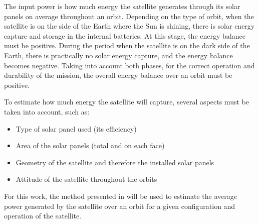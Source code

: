 



The input power is how much energy the satellite generates through its solar panels on average throughout an orbit. Depending on the type of orbit, when the satellite is on the side of the Earth where the Sun is shining, there is solar energy capture and storage in the internal batteries. At this stage, the energy balance must be positive. During the period when the satellite is on the dark side of the Earth, there is practically no solar energy capture, and the energy balance becomes negative. Taking into account both phases, for the correct operation and durability of the mission, the overall energy balance over an orbit must be positive.

To estimate how much energy the satellite will capture, several aspects must be taken into account, such as:

\begin{itemize}
    \item Type of solar panel used (its efficiency)
    \item Area of the solar panels (total and on each face)
    \item Geometry of the satellite and therefore the installed solar panels
    \item Attitude of the satellite throughout the orbits
\end{itemize}

For this work, the method presented in \cite{rigo2023} will be used to estimate the average power generated by the satellite over an orbit for a given configuration and operation of the satellite.

